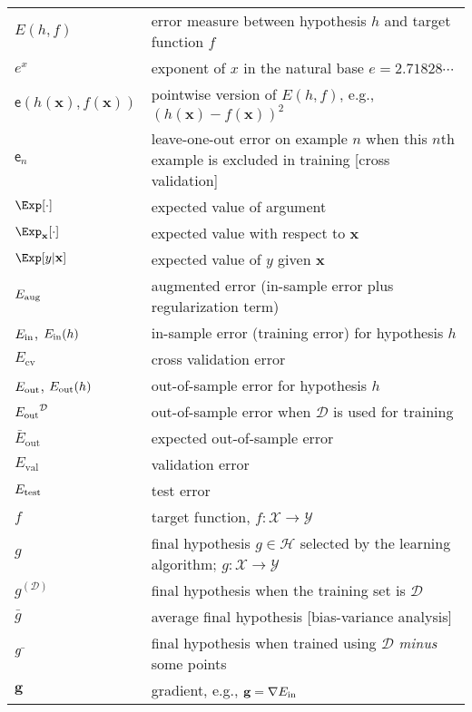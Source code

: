 \documentclass[10pt]{book}
\begin{document}
\begin{longtable}{lp{4.5in}}
$E({h},{f})$ & error measure between hypothesis ${h}$ and target function ${f}$\\
$e^{x}$& exponent of $x$ in the natural base
$e=2.71828\cdots$\\
${\textsf{e}}({h}({{\mathbf{x}}}),{f}({{\mathbf{x}}}))$ & pointwise version of $E({h},{f})$, e.g., $({h}({{\mathbf{x}}}) - {f}({{\mathbf{x}}}))^2$\\
${\textsf{e}}_n$ & leave-one-out error on example $n$ when this $n$th
example is excluded in training [cross validation]\\
$\Exp [\cdot]$ & expected value of argument\\
$\Exp_{{\mathbf{x}}} [\cdot]$ & expected value with respect to ${{\mathbf{x}}}$\\
$\Exp [{y}|{{\mathbf{x}}}]$ & expected value of ${y}$ given ${{\mathbf{x}}}$\\
${E_{\textrm{\textup{aug}}}}$ & augmented error (in-sample error plus regularization term)\\
${E_{\textrm{\textup{in}}}}$, ${E_{\textrm{\textup{in}}}}({h})$& in-sample error (training error)
for hypothesis ${h}$\\
${E_{\textrm{cv}}}$ & cross validation error\\
${E_{\textrm{\textup{out}}}}$, ${E_{\textrm{\textup{out}}}}({h})$
& out-of-sample error for hypothesis ${h}$\\
${E_{\textrm{\textup{out}}}}^\mathcal{D}$ & out-of-sample error when $\mathcal{D}$ is used for training\\
${\bar{E}}_{\textrm{out}}$ & expected out-of-sample error\\
$E_{\textrm{val}}$ & validation error\\
${E_{\textrm{\textup{test}}}}$ & test error\\
${f}$ & target function, ${f}\colon{\mathcal{X}} \to {\mathcal{Y}}$\\
${g}$ & final hypothesis ${g}\in{\mathcal{H}}$ selected by the learning algorithm; ${g}\colon{\mathcal{X}} \to {\mathcal{Y}}$\\
${g}^{(\mathcal{D})}$ & final hypothesis when the training set is $\mathcal{D}$\\
$\bar{g}$ & average final hypothesis [bias-variance analysis]\\
${g}^{\raisebox{1.1pt}{\hspace*{-0.4pt}{\rule{3pt}{0.3pt}}}}$ & final hypothesis when trained using 
$\mathcal{D}$ \emph{minus} some points\\
${\mathbf{g}}$ & gradient, e.g., ${\mathbf{g}}=\nabla{E_{\textrm{\textup{in}}}}$\\

\end{longtable}
\end{document}
